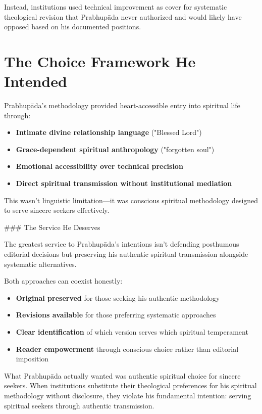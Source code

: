 \documentclass[11pt,twoside]{book}
\begin{document}
Instead, institutions used technical improvement as cover for systematic theological revision that Prabhupāda never authorized and would likely have opposed based on his documented positions.
\section*{The Choice Framework He Intended}
\label{sec:org2fc85f8}

Prabhupāda's methodology provided heart-accessible entry into spiritual life through:
\begin{itemize}
\item \textbf{\textbf{Intimate divine relationship language}} ("Blessed Lord")
\item \textbf{\textbf{Grace-dependent spiritual anthropology}} ("forgotten soul")
\item \textbf{\textbf{Emotional accessibility over technical precision}}
\item \textbf{\textbf{Direct spiritual transmission without institutional mediation}}
\end{itemize}

This wasn't linguistic limitation—it was conscious spiritual methodology designed to serve sincere seekers effectively.

\#\#\# The Service He Deserves

The greatest service to Prabhupāda's intentions isn't defending posthumous editorial decisions but preserving his authentic spiritual transmission alongside systematic alternatives.

Both approaches can coexist honestly:
\begin{itemize}
\item \textbf{\textbf{Original preserved}} for those seeking his authentic methodology
\item \textbf{\textbf{Revisions available}} for those preferring systematic approaches
\item \textbf{\textbf{Clear identification}} of which version serves which spiritual temperament
\item \textbf{\textbf{Reader empowerment}} through conscious choice rather than editorial imposition
\end{itemize}

What Prabhupāda actually wanted was authentic spiritual choice for sincere seekers. When institutions substitute their theological preferences for his spiritual methodology without disclosure, they violate his fundamental intention: serving spiritual seekers through authentic transmission.
\end{document}
